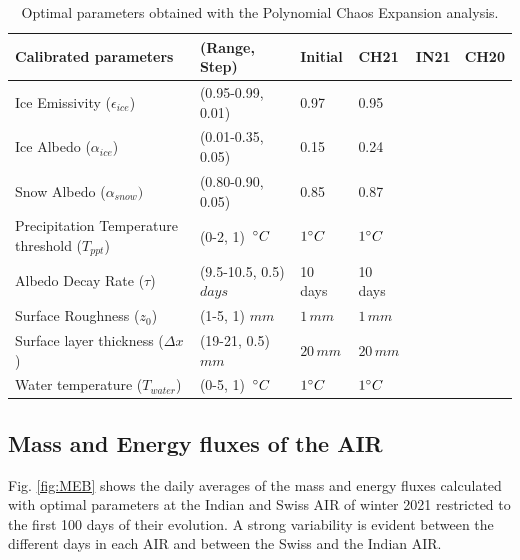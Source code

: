 \documentclass[utf8]{frontiersSCNS} %
\begin{document}
\begin{table}[]
\centering
\caption{Optimal parameters obtained with the Polynomial Chaos Expansion analysis.}
\label{tab:parameters}
\begin{tabular}{@{}llllll@{}}
\toprule
\textbf{Calibrated parameters} & \textbf{(Range, Step)} & \textbf{Initial} & \textbf{CH21} & \textbf{IN21} & \textbf{CH20} \\\midrule
Ice Emissivity ($\epsilon_{ice}$)               & (0.95-0.99, 0.01)                    & 0.97        & 0.95  &  &  \\
Ice Albedo ($\alpha_{ice}$)                     & (0.01-0.35, 0.05)                    & 0.15        & 0.24  &  &  \\
Snow Albedo ($\alpha_{snow})$                   & (0.80-0.90, 0.05)                    & 0.85        & 0.87  &  &  \\
Precipitation Temperature threshold ($T_{ppt}$) & (0-2, 1) $\,\degree C$ & $1\degree C$& $1\degree C$ &  &  \\
Albedo Decay Rate ($\tau$)                      & (9.5-10.5, 0.5) $days$                     & 10 days     & 10 days &  &  \\
Surface Roughness ($z_0$)                       & (1-5, 1) $mm$                     & $1\,mm$     & $1\,mm$ &  &  \\ 
Surface layer thickness ($\Delta x$)            & (19-21, 0.5) $mm$                    & $20\,mm$    & $20\,mm$ &  &  \\
Water temperature ($T_{water}$)                 & (0-5, 1) $\,\degree C$              & $1\degree C$&$1\degree C$  &  &
\\\bottomrule
\end{tabular}
\end{table}

\subsection{Mass and Energy fluxes of the AIR}

Fig. \ref{fig:MEB} shows the daily averages of the mass and energy fluxes calculated with optimal parameters at the
Indian and Swiss AIR of winter 2021 restricted to the first 100 days of their evolution. A strong variability is evident
between the different days in each AIR and between the Swiss and the Indian AIR.
\end{document}
